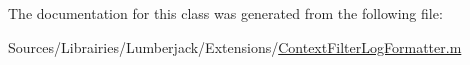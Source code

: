 The documentation for this class was generated from the following file\-:\begin{DoxyCompactItemize}
\item 
Sources/\-Librairies/\-Lumberjack/\-Extensions/\hyperlink{_context_filter_log_formatter_8m}{Context\-Filter\-Log\-Formatter.\-m}\end{DoxyCompactItemize}

